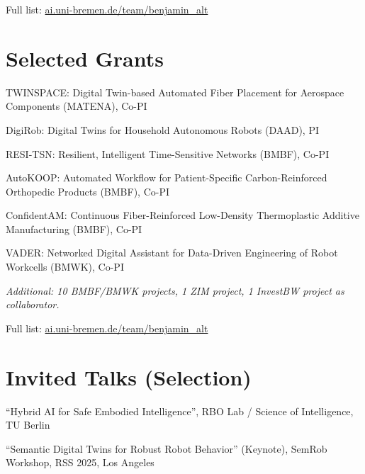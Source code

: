 \documentclass[11pt]{article} %
\begin{document}
\printbibliography[keyword=relevant,heading=none]

\smallskip
Full list: \href{https://ai.uni-bremen.de/team/benjamin_alt}{ai.uni-bremen.de/team/benjamin\_alt}


\section*{Selected Grants}

TWINSPACE: Digital Twin-based Automated Fiber Placement for Aerospace Components (MATENA), Co-PI

DigiRob: Digital Twins for Household Autonomous Robots (DAAD), PI

RESI-TSN: Resilient, Intelligent Time-Sensitive Networks (BMBF), Co-PI

AutoKOOP: Automated Workflow for Patient-Specific Carbon-Reinforced Orthopedic Products (BMBF), Co-PI

ConfidentAM: Continuous Fiber-Reinforced Low-Density Thermoplastic Additive Manufacturing (BMBF), Co-PI

VADER: Networked Digital Assistant for Data-Driven Engineering of Robot Workcells (BMWK), Co-PI

\smallskip
\textit{Additional: 10 BMBF/BMWK projects, 1 ZIM project, 1 InvestBW project as collaborator.}

Full list: \href{https://ai.uni-bremen.de/team/benjamin_alt}{ai.uni-bremen.de/team/benjamin\_alt}


\section*{Invited Talks (Selection)}

``Hybrid AI for Safe Embodied Intelligence'', RBO Lab / Science of Intelligence, TU Berlin

``Semantic Digital Twins for Robust Robot Behavior'' (Keynote), SemRob Workshop, RSS 2025, Los Angeles
\end{document}
